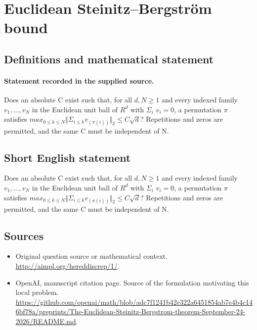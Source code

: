 \documentclass[11pt]{article}
\begin{document}
\section*{Euclidean Steinitz–Bergström bound}\label{30007118}
\subsection{Definitions and mathematical statement}
\paragraph{Statement recorded in the supplied source.}
Does an absolute C exist such that, for all $d,N\geq 1$ and every indexed family $v_{1},\dots ,v_N$ in the Euclidean unit ball of $R^{d}$ with $\Sigma _i$ $v_i=0$, a permutation $\pi $ satisfies $max_{0\leq k\leq N}\Vert \Sigma _{i\leq k}v_(\pi (i))\Vert _{2}\leq C\surd d$? Repetitions and zeros are permitted, and the same C must be independent of N.
\subsection{Short English statement}
Does an absolute C exist such that, for all $d,N\geq 1$ and every indexed family $v_{1},\dots ,v_N$ in the Euclidean unit ball of $R^{d}$ with $\Sigma _i$ $v_i=0$, a permutation $\pi $ satisfies $max_{0\leq k\leq N}\Vert \Sigma _{i\leq k}v_(\pi (i))\Vert _{2}\leq C\surd d$? Repetitions and zeros are permitted, and the same C must be independent of N.
\subsection{Sources}
\begin{itemize}
\item[S1] Original question source or mathematical context.
\url{http://aimpl.org/hereddiscrep/1/}.
\item[S2] OpenAI, manuscript citation page. Source of the formulation motivating this local problem.
\url{https://github.com/openai/math/blob/adc7f1241b42e322a6451854ab7e4b4c146bf78a/preprints/The-Euclidean-Steinitz-Bergstrom-theorem-September-24-2026/README.md}.
\end{itemize}
\end{document}
